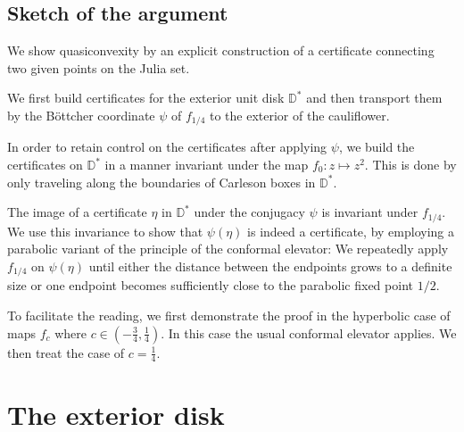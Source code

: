 \subsection{Sketch of the argument}

We show quasiconvexity by an explicit construction of a certificate connecting two given points on the Julia set.

We first build certificates for the exterior unit disk $\mathbb D ^*$ and then transport them by the Böttcher coordinate $\psi$ of $f_{1/4}$ to the exterior of the cauliflower.

In order to retain control on the certificates after applying $\psi$, we build the certificates on $\mathbb D^*$ in a manner invariant under the map $f_0: z\mapsto z^2$. This is done by only traveling along the boundaries of Carleson boxes in $\mathbb D^{*}$. 

The image of a certificate $\eta$ in $\mathbb D^{*}$ under the conjugacy $\psi$ is invariant under $f_{1/4}$. We use this invariance to show that $\psi(\eta)$ is indeed a certificate, by employing a parabolic variant of the principle of the conformal elevator: We repeatedly apply $f_{1/4}$ on $\psi(\eta)$ until either the distance between the endpoints grows to a definite size or one endpoint becomes sufficiently close to the parabolic fixed point $1/2$.

To facilitate the reading, we first demonstrate the proof in the hyperbolic case of maps $f_c$ where  $c\in\left(-\frac 34,\frac{1}{4}\right)$. In this case the usual conformal elevator applies. We then treat the case of $c=\frac 14$.



\section{The exterior disk}

\begin{comment}
The exterior $\D^{*}=\left\{ \left|z\right|>1\right\} $ of the unit
disk is trivially quasiconvex by connecting points along the perimeter of the circle. However, these paths follow the boundary closely and their length would blow up if we transport them to the exterior of $\mathcal{J}(f_{c})$, $c\neq0$, via the Riemann map. Instead,
\end{comment}


